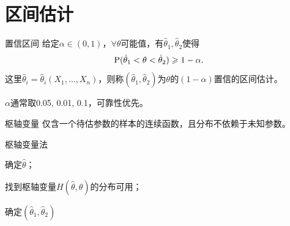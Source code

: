 \section{区间估计}
\begin{definition}{置信区间}{}
	给定$\alpha \in (0,1)$，$\forall\theta$可能值，有$\hat\theta_1,\hat\theta_2$使得
	\begin{equation}
		\P(\hat\theta_1 < \theta < \hat\theta_2) \geqslant 1 - \alpha.
	\end{equation}
	这里$\hat\theta_i = \hat\theta_i(X_1,\ldots,X_n)$，则称$(\hat\theta_1,\hat\theta_2)$为$\theta$的$(1 - \alpha)$置信的区间估计。
\end{definition}
$\alpha$通常取0.05, 0.01, 0.1，可靠性优先。
\begin{definition}{枢轴变量}{}
	仅含一个待估参数的样本的连续函数，且分布不依赖于未知参数。
\end{definition}
\begin{method}{枢轴变量法}{}
	\begin{compactenum}
		\item 确定$\hat\theta$；
		\item 找到枢轴变量$H(\hat\theta,\theta)$的分布可用；
		\item 确定$(\hat\theta_1,\hat\theta_2)$
	\end{compactenum}
\end{method}
